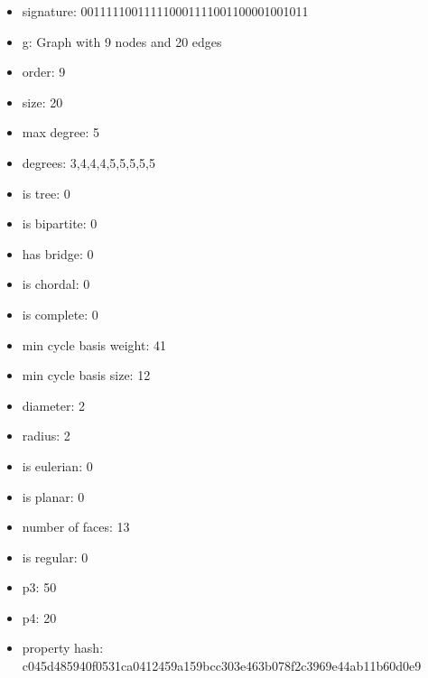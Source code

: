 \newpage
\begin{figure}
\end{figure}
\begin{itemize}
\item signature: 001111100111110001111001100001001011
\item g: Graph with 9 nodes and 20 edges
\item order: 9
\item size: 20
\item max degree: 5
\item degrees: 3,4,4,4,5,5,5,5,5
\item is tree: 0
\item is bipartite: 0
\item has bridge: 0
\item is chordal: 0
\item is complete: 0
\item min cycle basis weight: 41
\item min cycle basis size: 12
\item diameter: 2
\item radius: 2
\item is eulerian: 0
\item is planar: 0
\item number of faces: 13
\item is regular: 0
\item p3: 50
\item p4: 20
\item property hash: c045d485940f0531ca0412459a159bcc303e463b078f2c3969e44ab11b60d0e9
\end{itemize}
